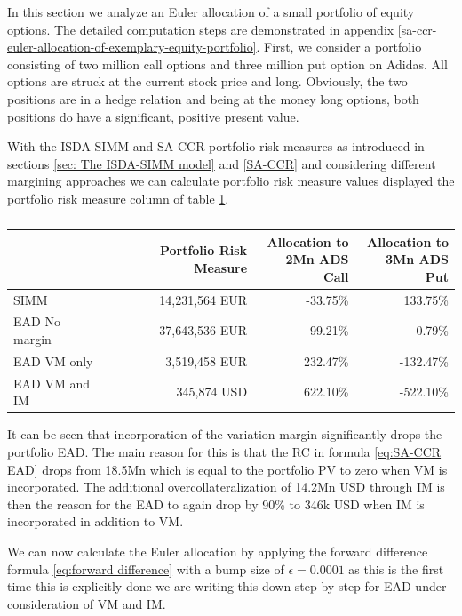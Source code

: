 \documentclass[../Thesis_AHoecherl.tex]{subfiles}
\begin{document}
    In this section we analyze an Euler allocation of a small portfolio of equity options. The detailed computation steps are demonstrated in appendix \ref{sa-ccr-euler-allocation-of-exemplary-equity-portfolio}. 
    First, we consider a portfolio consisting of two million call options and three million put option on Adidas. All options are struck at the current stock price and long. Obviously, the two positions are in a hedge relation and being at the money long options, both positions do have a significant, positive present value.
    
    With the ISDA-SIMM and SA-CCR portfolio risk measures as introduced in sections \ref{sec: The ISDA-SIMM model} and \ref{SA-CCR} and considering different margining approaches we can calculate portfolio risk measure values displayed the portfolio risk measure column of table \ref{tab:2TradeEquityResults}.
    \begin{table}[htbp]
        \centering
        \begin{tabular}{l||r|r|r}
            & Portfolio Risk Measure & \makecell{Allocation to \\ 2Mn ADS Call} & \makecell{Allocation to \\ 3Mn ADS Put} \\
                \toprule
        SIMM  & 14,231,564 EUR & -33.75\% & 133.75\%  \\
        EAD No margin & 37,643,536 EUR & 99.21\% & 0.79\%  \\
        EAD VM only & 3,519,458 EUR & 232.47\% & -132.47\%  \\
        EAD VM and IM & 345,874 USD  & 622.10\% & -522.10\% \\
        \end{tabular}%
        \caption{}
        \label{tab:2TradeEquityResults}%
    \end{table}%
    It can be seen that incorporation of the variation margin significantly drops the portfolio EAD. The main reason for this is that the RC in formula \ref{eq:SA-CCR EAD} drops from 18.5Mn which is equal to the portfolio PV to zero when VM is incorporated.
    The additional overcollateralization of 14.2Mn USD through IM is then the reason for the EAD to again drop by 90\% to 346k USD when IM is incorporated in addition to VM.

    We can now calculate the Euler allocation by applying the forward difference formula \ref{eq:forward difference} with a bump size of $\epsilon = 0.0001$ as this is the first time this is explicitly done we are writing this down step by step for EAD under consideration of VM and IM.
\end{document}
